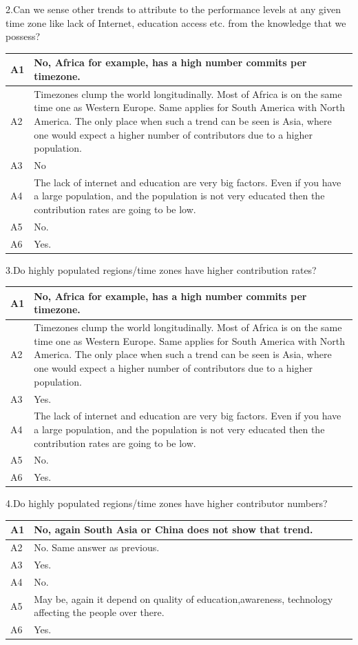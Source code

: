 \documentclass[double,12pt]{beavtex}
\begin{document}
2.Can we sense other trends to attribute to the performance levels at any given time zone like lack of Internet, education access etc. from the knowledge that we possess?


\begin{tabular}{ |p{2cm}|p{12cm}| }
 \hline
 A1 & No, Africa for example, has a high number commits per timezone.\\
 \hline
 A2 & Timezones clump the world longitudinally. Most of Africa is on the same time one as Western Europe. Same applies for South America with North America. The only place when such a trend can be seen is Asia, where one would expect a higher number of contributors due to a higher population.\\ \hline
 A3 & No\\ \hline
 A4 & The lack of internet and education are very big factors. Even if you have a large population, and the population is not very educated then the contribution rates are going to be low.\\ \hline
 A5 & No.\\ \hline
 A6 & Yes.\\
 \hline
\end{tabular}


3.Do highly populated regions/time zones have higher contribution rates?


\begin{tabular}{ |p{2cm}|p{12cm}| }
 \hline
 A1 & No, Africa for example, has a high number commits per timezone.\\
 \hline
 A2 & Timezones clump the world longitudinally. Most of Africa is on the same time one as Western Europe. Same applies for South America with North America. The only place when such a trend can be seen is Asia, where one would expect a higher number of contributors due to a higher population.\\ \hline
 A3 & Yes.\\ \hline
 A4 & The lack of internet and education are very big factors. Even if you have a large population, and the population is not very educated then the contribution rates are going to be low.\\ \hline
 A5 & No.\\ \hline
 A6 & Yes.\\
 \hline
\end{tabular}


4.Do highly populated regions/time zones have higher contributor numbers?


\begin{tabular}{ |p{2cm}|p{12cm}| }
 \hline
 A1 & No, again South Asia or China does not show that trend.\\
 \hline
 A2 & No. Same answer as previous.\\ \hline
 A3 & Yes.\\ \hline
 A4 & No.\\ \hline
 A5 & May be, again it depend on quality of education,awareness, technology affecting the people over there.\\ \hline
 A6 & Yes.\\
 \hline
\end{tabular}
\end{document}
